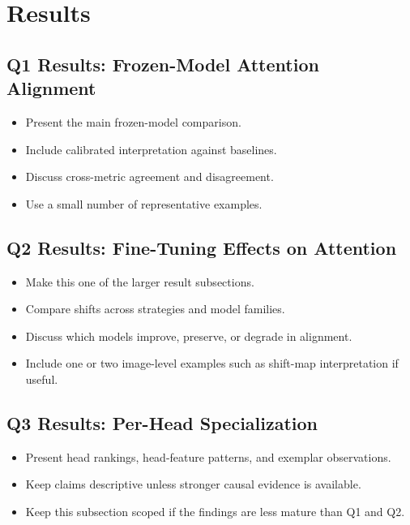 \documentclass[11pt]{article}
\begin{document}
\section{Results}

\subsection{Q1 Results: Frozen-Model Attention Alignment}

\begin{itemize}[leftmargin=1.5em]
    \item Present the main frozen-model comparison.
    \item Include calibrated interpretation against baselines.
    \item Discuss cross-metric agreement and disagreement.
    \item Use a small number of representative examples.
\end{itemize}

\subsection{Q2 Results: Fine-Tuning Effects on Attention}

\begin{itemize}[leftmargin=1.5em]
    \item Make this one of the larger result subsections.
    \item Compare shifts across strategies and model families.
    \item Discuss which models improve, preserve, or degrade in alignment.
    \item Include one or two image-level examples such as shift-map
    interpretation if useful.
\end{itemize}

\subsection{Q3 Results: Per-Head Specialization}

\begin{itemize}[leftmargin=1.5em]
    \item Present head rankings, head-feature patterns, and exemplar
    observations.
    \item Keep claims descriptive unless stronger causal evidence is available.
    \item Keep this subsection scoped if the findings are less mature than Q1
    and Q2.
\end{itemize}
\end{document}
